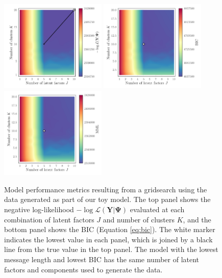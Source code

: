\documentclass[twocolumn]{aastex62}
\newcommand{\vect}[1]{\boldsymbol{\mathbf{#1}}}
\renewcommand{\vec}[1]{\vect{#1}}
\newcommand{\data}{\textbf{Y}}
\begin{document}
\begin{figure}
	\includegraphics[width=0.45\textwidth]{experiments/exp1-gridsearch-ll-contours.pdf}
	\includegraphics[width=0.45\textwidth]{experiments/exp1-gridsearch-bic-contours.pdf}
	\includegraphics[width=0.45\textwidth]{experiments/exp1-gridsearch-mml-contours.pdf}
    \caption{Model performance metrics resulting from a gridsearch using the
    		 data generated as part of our toy model. The top 
		 	 panel shows the negative log-likelihood 
			 $-\log{\mathcal{L}\left(\data|\vec\Psi\right)}$ 
			 evaluated at each combination of latent factors $J$ and number 
			 of clusters $K$, and the bottom panel shows the BIC (Equation \ref{eq:bic}).
			 The white marker indicates the 
			 lowest value in each panel, which is joined by a black line from the true value
			 in the top panel. The model with the lowest message length and lowest BIC has
			 the same number of latent factors and components used to generate the data.
		}
    \label{fig:experiment-1-gridsearch}
\end{figure}
\end{document}
